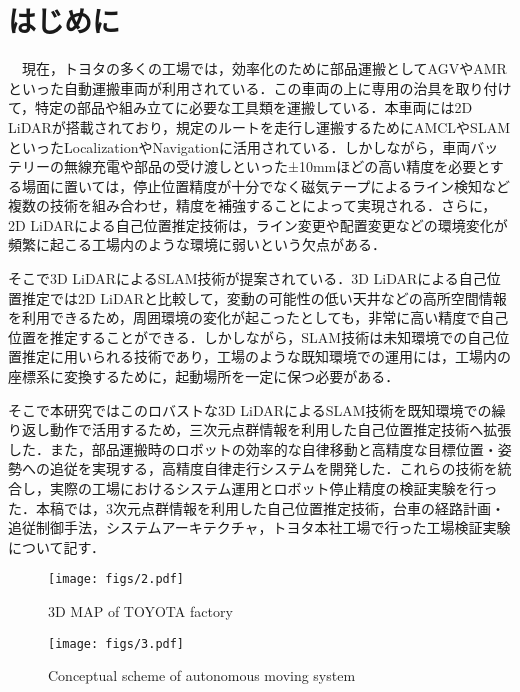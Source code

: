 \section{はじめに}
　現在，トヨタの多くの工場では，効率化のために部品運搬としてAGVやAMRといった自動運搬車両が利用されている．この車両の上に専用の治具を取り付けて，特定の部品や組み立てに必要な工具類を運搬している．本車両には2D LiDARが搭載されており，規定のルートを走行し運搬するためにAMCLやSLAM\cite{2d-AMCL, 2d-SLAM}といったLocalizationやNavigationに活用されている．しかしながら，車両バッテリーの無線充電や部品の受け渡しといった±10mmほどの高い精度を必要とする場面に置いては，停止位置精度が十分でなく磁気テープによるライン検知など複数の技術を組み合わせ，精度を補強することによって実現される．さらに，2D LiDARによる自己位置推定技術は，ライン変更や配置変更などの環境変化が頻繁に起こる工場内のような環境に弱いという欠点がある．

そこで3D LiDARによるSLAM技術が提案されている\cite{FAST-LIO, FAST-LIO2}．3D LiDARによる自己位置推定では2D LiDARと比較して，変動の可能性の低い天井などの高所空間情報を利用できるため，周囲環境の変化が起こったとしても，非常に高い精度で自己位置を推定することができる．しかしながら，SLAM技術は未知環境での自己位置推定に用いられる技術であり，工場のような既知環境での運用には，工場内の座標系に変換するために，起動場所を一定に保つ必要がある．

そこで本研究ではこのロバストな3D LiDARによるSLAM技術を既知環境での繰り返し動作で活用するため，三次元点群情報を利用した自己位置推定技術へ拡張した．また，部品運搬時のロボットの効率的な自律移動と高精度な目標位置・姿勢への追従を実現する，高精度自律走行システムを開発した．これらの技術を統合し，実際の工場におけるシステム運用とロボット停止精度の検証実験を行った．本稿では，3次元点群情報を利用した自己位置推定技術，台車の経路計画・追従制御手法，システムアーキテクチャ，トヨタ本社工場で行った工場検証実験について記す．

\begin{figure}[!b]
\texttt{[image: figs/2.pdf]}
\caption{3D MAP of TOYOTA factory}
\label{fig:fig2}
\end{figure}

\begin{figure}[!b]
\texttt{[image: figs/3.pdf]}
\caption{Conceptual scheme of autonomous moving system}
\label{fig:fig3}
\end{figure}
